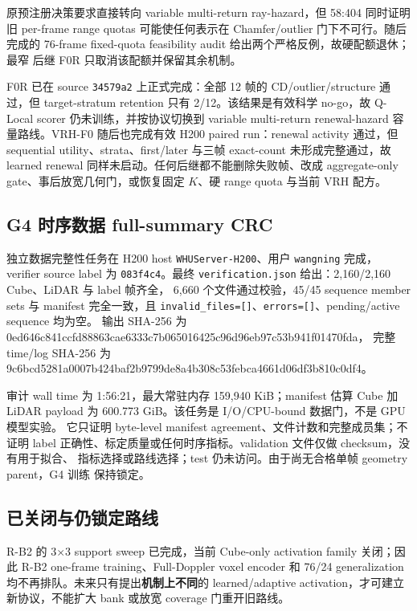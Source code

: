 \documentclass[11pt,a4paper,fontset=none]{ctexart}
\newcommand{\code}[1]{\texttt{#1}}
\newcommand{\hash}[2]{{\small\ttfamily #1\allowbreak{}#2}}
\begin{document}
原预注册决策要求直接转向 variable multi-return ray-hazard，但 58:404 同时证明旧
per-frame range quotas 可能使任何表示在 Chamfer/outlier 门下不可行。随后完成的
76-frame fixed-quota feasibility audit 给出两个严格反例，故硬配额退休；最窄
后继 F0R 只取消该配额并保留其余机制。

F0R 已在 source \code{34579a2} 上正式完成：全部 12 帧的 CD/outlier/structure
通过，但 target-stratum retention 只有 2/12。该结果是有效科学 no-go，故
Q-Local scorer 仍未训练，并按协议切换到 variable multi-return renewal-hazard
容量路线。VRH-F0 随后也完成有效 H200 paired run：renewal activity 通过，但
sequential utility、strata、first/later 与三帧 exact-count 未形成完整通过，故
learned renewal 同样未启动。任何后继都不能删除失败帧、改成 aggregate-only
gate、事后放宽几何门，或恢复固定 $K$、硬 range quota 与当前 VRH 配方。

\subsection{G4 时序数据 full-summary CRC}

独立数据完整性任务在 H200 host \code{WHUServer-H200}、用户 \code{wangning}
完成，verifier source label 为 \code{083f4c4}。最终
\code{verification.json} 给出：2,160/2,160 Cube、LiDAR 与 label 帧齐全，
6,660 个文件通过校验，45/45 sequence member sets 与 manifest 完全一致，且
\code{invalid\_files=[]}、\code{errors=[]}、pending/active sequence 均为空。
输出 SHA-256 为
\hash{0ed646c841ccfd88863cae6333c7b065}{016425c96d96eb97c53b941f01470fda}，
完整 time/log SHA-256 为
\hash{9c6bcd5281a0007b424baf2b9799de8a}{4b308c53febca4661d06df3b810c0df4}。

审计 wall time 为 1:56:21，最大常驻内存 159,940 KiB；manifest 估算 Cube 加
LiDAR payload 为 600.773 GiB。该任务是 I/O/CPU-bound 数据门，不是 GPU 模型实验。
它只证明 byte-level manifest agreement、文件计数和完整成员集；不证明 label
正确性、标定质量或任何时序指标。validation 文件仅做 checksum，没有用于拟合、
指标选择或路线选择；test 仍未访问。由于尚无合格单帧 geometry parent，G4 训练
保持锁定。

\subsection{已关闭与仍锁定路线}

R-B2 的 3$\times$3 support sweep 已完成，当前 Cube-only activation family
关闭；因此 R-B2 one-frame training、Full-Doppler voxel encoder 和 76/24
generalization 均不再排队。未来只有提出\textbf{机制上不同}的 learned/adaptive
activation，才可建立新协议，不能扩大 bank 或放宽 coverage 门重开旧路线。
\end{document}

